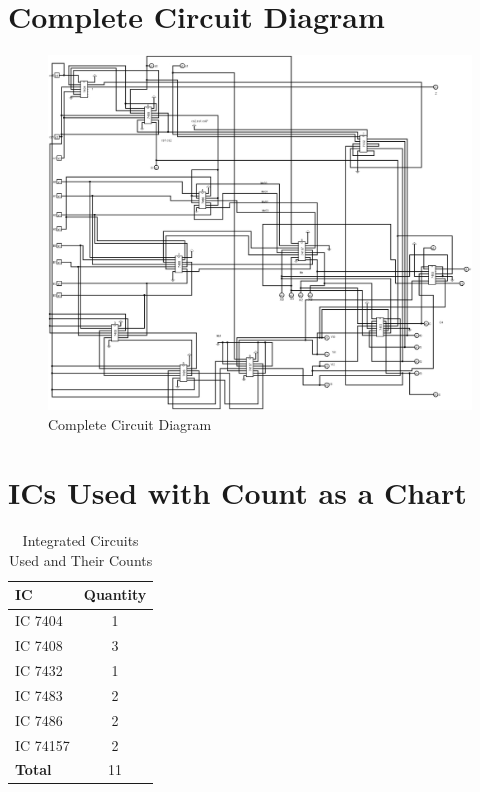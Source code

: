 \documentclass{article}
\begin{document}
\section{Complete Circuit Diagram}
\begin{figure}[h!]

\includegraphics[width=1\textwidth]{cir.jpg} %
\caption{Complete Circuit Diagram}
\label{fig-3}
\end{figure}
\pagebreak
\section{ICs Used with Count as a Chart}
\begin{table}[h!]
\centering
\Large %
\begin{tabular}{|l|c|} %
\hline
\textbf{IC} & \textbf{Quantity} \\ 
\hline
IC 7404 & 1 \\ 
IC 7408 & 3 \\ 
IC 7432 & 1 \\ 
IC 7483 & 2 \\ 
IC 7486 & 2 \\ 
IC 74157 & 2 \\ 
\hline
\textbf{Total} & 11 \\ 
\hline
\end{tabular}
\label{Table-IC_count}
\caption{Integrated Circuits Used and Their Counts}
\end{table}
\end{document}
